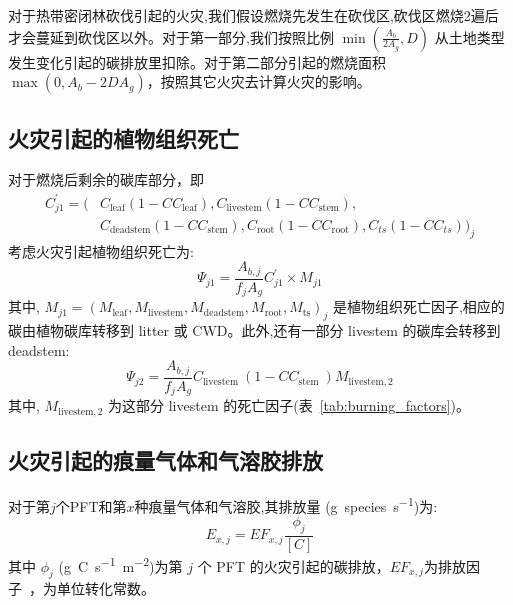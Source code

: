 对于热带密闭林砍伐引起的火灾,我们假设燃烧先发生在砍伐区,砍伐区燃烧2遍后才会蔓延到砍伐区以外。对于第一部分,我们按照比例 $\min \left(\frac{A_{b}}{2 A_{g}}, D\right)$ 从土地类型发生变化引起的碳排放里扣除。对于第二部分引起的燃烧面积 $\max(0, A_b-2DA_g)$，按照其它火灾去计算火灾的影响。


\subsection{火灾引起的植物组织死亡}

对于燃烧后剩余的碳库部分，即
\begin{equation}
\begin{aligned}
C_{j 1}^{\prime}=\big(& C_{\text {leaf}}\left(1-C C_{\text {leaf}}\right), C_{\text {livestem}}\left(1-C C_{\text {stem}}\right), \\
&C_{\text {deadstem}}\left(1-C C_{\text {stem}}\right), C_{\text {root}}\left(1-C C_{\text {root}}\right), C_{t s}\left(1-C C_{t s}\right)\big)_{j}
\end{aligned}
\end{equation}
%
考虑火灾引起植物组织死亡为:
\begin{equation}
\Psi_{j 1}=\frac{A_{b, j}}{f_{j} A_{g}} C_{j 1}^{\prime} \times M_{j 1}
\end{equation}
%
其中, $
M_{j 1}=\left(M_{\text{leaf}}, M_{\text{livestem}}, M_{\text{deadstem}}, M_{\text {root}}, M_{\text {ts}}\right)_{j}
$ 是植物组织死亡因子,相应的碳由植物碳库转移到 litter 或 CWD。此外,还有一部分 livestem 的碳库会转移到 deadstem:
\begin{equation}
\Psi_{j 2}=\frac{A_{b, j}}{f_{j} A_{g}} C_{\text {livestem }}\left(1-C C_{\text {stem }}\right) M_{\text {livestem}, 2}
\end{equation}
%
其中, $M_{\text{livestem},2}$ 为这部分 livestem 的死亡因子(表~\ref{tab:burning_factors})。


\subsection{火灾引起的痕量气体和气溶胶排放}

对于第$j$个PFT和第$x$种痕量气体和气溶胶,其排放量 (\unit{g.species.s^{-1}})为:
\begin{equation}
E_{x, j}=E F_{x, j} \frac{\phi_{j}}{[C]}
\end{equation}
其中 $\phi_{j}$ (\unit{g.C.s^{-1}.m^{-2}})为第 $j$ 个 PFT 的火灾引起的碳排放，$E F_{x, j}$为排放因子~\citep{LiF2019}，为单位转化常数。


